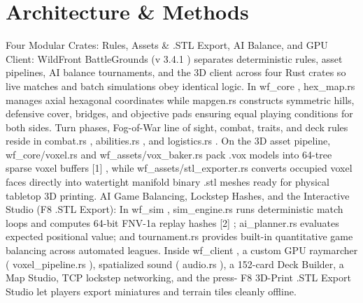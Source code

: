 \documentclass[10pt,letterpaper]{article}
\begin{document}
\section{Architecture \& Methods}
Four Modular Crates: Rules, Assets \& .STL Export, AI Balance, and GPU Client: WildFront BattleGrounds (v 3.4.1 ) separates deterministic rules, asset pipelines, AI balance tournaments, and the 3D client across four Rust crates so live matches and batch simulations obey identical logic. In wf\_core , hex\_map.rs manages axial hexagonal coordinates while mapgen.rs constructs symmetric hills, defensive cover, bridges, and objective pads ensuring equal playing conditions for both sides. Turn phases, Fog-of-War line of sight, combat, traits, and deck rules reside in combat.rs , abilities.rs , and logistics.rs . On the 3D asset pipeline, wf\_core/voxel.rs and wf\_assets/vox\_baker.rs pack .vox models into 64-tree sparse voxel buffers [1] , while wf\_assets/stl\_exporter.rs converts occupied voxel faces directly into watertight manifold binary .stl meshes ready for physical tabletop 3D printing. AI Game Balancing, Lockstep Hashes, and the Interactive Studio (F8 .STL Export): In wf\_sim , sim\_engine.rs runs deterministic match loops and computes 64-bit FNV-1a replay hashes [2] ; ai\_planner.rs evaluates expected positional value; and tournament.rs provides built-in quantitative game balancing across automated leagues. Inside wf\_client , a custom GPU raymarcher ( voxel\_pipeline.rs ), spatialized sound ( audio.rs ), a 152-card Deck Builder, a Map Studio, TCP lockstep networking, and the press- F8 3D-Print .STL Export Studio let players export miniatures and terrain tiles cleanly offline.
\end{document}
